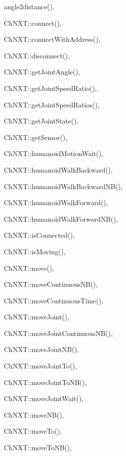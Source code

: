 \begin{theindex}

  \item angle2distance(), 

  \indexspace

  \item ChNXT::connect(), 
  \item ChNXT::connectWithAddress(), 
  \item ChNXT::disconnect(), 
  \item ChNXT::getJointAngle(), 
  \item ChNXT::getJointSpeedRatio(), 
  \item ChNXT::getJointSpeedRatios(), 
  \item ChNXT::getJointState(), 
  \item ChNXT::getSensor(), 
  \item ChNXT::humanoidMotionWait(), 
  \item ChNXT::humanoidWalkBackward(), 
  \item ChNXT::humanoidWalkBackwardNB(), 
  \item ChNXT::humanoidWalkForward(), 
  \item ChNXT::humanoidWalkForwardNB(), 
  \item ChNXT::isConnected(), 
  \item ChNXT::isMoving(), 
  \item ChNXT::move(), 
  \item ChNXT::moveContinuousNB(), 
  \item ChNXT::moveContinuousTime(), 
  \item ChNXT::moveJoint(), 
  \item ChNXT::moveJointContinuousNB(), 
  \item ChNXT::moveJointNB(), 
  \item ChNXT::moveJointTo(), 
  \item ChNXT::moveJointToNB(), 
  \item ChNXT::moveJointWait(), 
  \item ChNXT::moveNB(), 
  \item ChNXT::moveTo(), 
  \item ChNXT::moveToNB(), 

\end{theindex}
